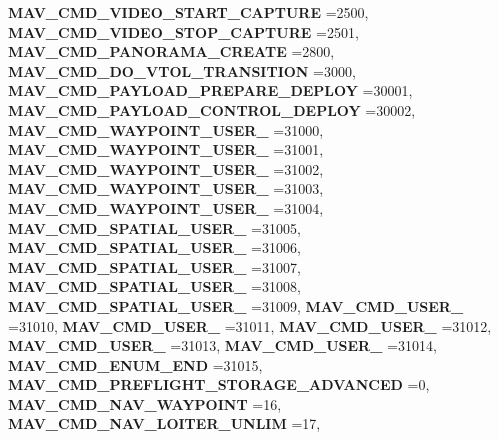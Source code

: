 \begin{DoxyCompactItemize}
\newline
\textbf{ M\+A\+V\+\_\+\+C\+M\+D\+\_\+\+V\+I\+D\+E\+O\+\_\+\+S\+T\+A\+R\+T\+\_\+\+C\+A\+P\+T\+U\+RE} =2500, 
\textbf{ M\+A\+V\+\_\+\+C\+M\+D\+\_\+\+V\+I\+D\+E\+O\+\_\+\+S\+T\+O\+P\+\_\+\+C\+A\+P\+T\+U\+RE} =2501, 
\textbf{ M\+A\+V\+\_\+\+C\+M\+D\+\_\+\+P\+A\+N\+O\+R\+A\+M\+A\+\_\+\+C\+R\+E\+A\+TE} =2800, 
\textbf{ M\+A\+V\+\_\+\+C\+M\+D\+\_\+\+D\+O\+\_\+\+V\+T\+O\+L\+\_\+\+T\+R\+A\+N\+S\+I\+T\+I\+ON} =3000, 
\newline
\textbf{ M\+A\+V\+\_\+\+C\+M\+D\+\_\+\+P\+A\+Y\+L\+O\+A\+D\+\_\+\+P\+R\+E\+P\+A\+R\+E\+\_\+\+D\+E\+P\+L\+OY} =30001, 
\textbf{ M\+A\+V\+\_\+\+C\+M\+D\+\_\+\+P\+A\+Y\+L\+O\+A\+D\+\_\+\+C\+O\+N\+T\+R\+O\+L\+\_\+\+D\+E\+P\+L\+OY} =30002, 
\textbf{ M\+A\+V\+\_\+\+C\+M\+D\+\_\+\+W\+A\+Y\+P\+O\+I\+N\+T\+\_\+\+U\+S\+E\+R\+\_} =31000, 
\textbf{ M\+A\+V\+\_\+\+C\+M\+D\+\_\+\+W\+A\+Y\+P\+O\+I\+N\+T\+\_\+\+U\+S\+E\+R\+\_} =31001, 
\newline
\textbf{ M\+A\+V\+\_\+\+C\+M\+D\+\_\+\+W\+A\+Y\+P\+O\+I\+N\+T\+\_\+\+U\+S\+E\+R\+\_} =31002, 
\textbf{ M\+A\+V\+\_\+\+C\+M\+D\+\_\+\+W\+A\+Y\+P\+O\+I\+N\+T\+\_\+\+U\+S\+E\+R\+\_} =31003, 
\textbf{ M\+A\+V\+\_\+\+C\+M\+D\+\_\+\+W\+A\+Y\+P\+O\+I\+N\+T\+\_\+\+U\+S\+E\+R\+\_} =31004, 
\textbf{ M\+A\+V\+\_\+\+C\+M\+D\+\_\+\+S\+P\+A\+T\+I\+A\+L\+\_\+\+U\+S\+E\+R\+\_} =31005, 
\newline
\textbf{ M\+A\+V\+\_\+\+C\+M\+D\+\_\+\+S\+P\+A\+T\+I\+A\+L\+\_\+\+U\+S\+E\+R\+\_} =31006, 
\textbf{ M\+A\+V\+\_\+\+C\+M\+D\+\_\+\+S\+P\+A\+T\+I\+A\+L\+\_\+\+U\+S\+E\+R\+\_} =31007, 
\textbf{ M\+A\+V\+\_\+\+C\+M\+D\+\_\+\+S\+P\+A\+T\+I\+A\+L\+\_\+\+U\+S\+E\+R\+\_} =31008, 
\textbf{ M\+A\+V\+\_\+\+C\+M\+D\+\_\+\+S\+P\+A\+T\+I\+A\+L\+\_\+\+U\+S\+E\+R\+\_} =31009, 
\newline
\textbf{ M\+A\+V\+\_\+\+C\+M\+D\+\_\+\+U\+S\+E\+R\+\_} =31010, 
\textbf{ M\+A\+V\+\_\+\+C\+M\+D\+\_\+\+U\+S\+E\+R\+\_} =31011, 
\textbf{ M\+A\+V\+\_\+\+C\+M\+D\+\_\+\+U\+S\+E\+R\+\_} =31012, 
\textbf{ M\+A\+V\+\_\+\+C\+M\+D\+\_\+\+U\+S\+E\+R\+\_} =31013, 
\newline
\textbf{ M\+A\+V\+\_\+\+C\+M\+D\+\_\+\+U\+S\+E\+R\+\_} =31014, 
\textbf{ M\+A\+V\+\_\+\+C\+M\+D\+\_\+\+E\+N\+U\+M\+\_\+\+E\+ND} =31015, 
\textbf{ M\+A\+V\+\_\+\+C\+M\+D\+\_\+\+P\+R\+E\+F\+L\+I\+G\+H\+T\+\_\+\+S\+T\+O\+R\+A\+G\+E\+\_\+\+A\+D\+V\+A\+N\+C\+ED} =0, 
\textbf{ M\+A\+V\+\_\+\+C\+M\+D\+\_\+\+N\+A\+V\+\_\+\+W\+A\+Y\+P\+O\+I\+NT} =16, 
\newline
\textbf{ M\+A\+V\+\_\+\+C\+M\+D\+\_\+\+N\+A\+V\+\_\+\+L\+O\+I\+T\+E\+R\+\_\+\+U\+N\+L\+IM} =17, 

\end{DoxyCompactItemize}
